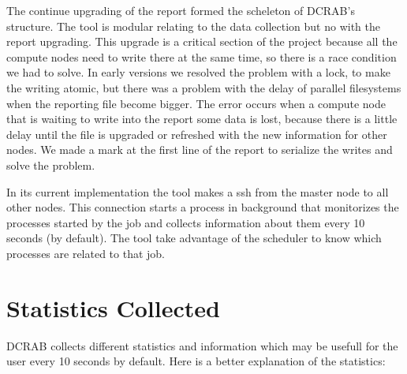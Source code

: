 \documentclass[10pt,a4paper]{report}
\begin{document}
The continue upgrading of the report formed the scheleton of DCRAB's structure. The tool is modular relating to the data collection but no with the report upgrading. This upgrade is a critical section of the project because all the compute nodes need to write there at the same time, so there is a race condition we had to solve. In early versions we resolved the problem with a lock, to make the writing atomic, but there was a problem with the delay of parallel filesystems when the reporting file become bigger. The error occurs when a compute node that is waiting to write into the report some data is lost, because there is a little delay until the file is upgraded or refreshed with the new information for other nodes. We made a mark at the first line of the report to serialize the writes and solve the problem.

In its current implementation the tool makes a ssh from the master node to all other nodes. This connection starts a process in background that monitorizes the processes started by the job and collects information about them every 10 seconds (by default). The tool take advantage of the scheduler to know which processes are related to that job.

\section{Statistics Collected}

DCRAB collects different statistics and information which may be usefull for the user every 10 seconds by default. Here is a better explanation of the statistics:
\end{document}
